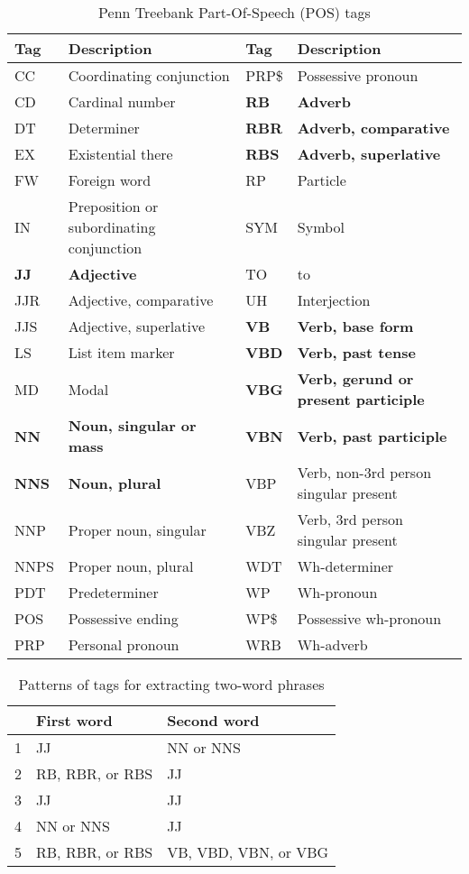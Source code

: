 \begin{table}\centering
	\caption{Penn Treebank Part-Of-Speech (POS) tags}\label{tab:posTags}
   	\begin{tabular}{|l|p{5cm\textwidth}|l|p{5cm\textwidth}|}
   	\hline
   	\textbf{Tag}  & \textbf{Description} & \textbf{Tag}  & \textbf{Description}\\ \hline
	CC &Coordinating conjunction &PRP\$ &Possessive pronoun \\ \hline
	CD &Cardinal number &\textbf{RB} &\textbf{Adverb} \\ \hline
	DT &Determiner &\textbf{RBR} &\textbf{Adverb, comparative} \\ \hline
	EX &Existential there &\textbf{RBS} &\textbf{Adverb, superlative} \\ \hline
	FW &Foreign word &RP &Particle \\ \hline
	IN &Preposition or subordinating conjunction &SYM &Symbol \\ \hline
	\textbf{JJ} &\textbf{Adjective} &TO &to \\ \hline
	JJR &Adjective, comparative &UH &Interjection \\ \hline
	JJS &Adjective, superlative &\textbf{VB} &\textbf{Verb, base form} \\ \hline
	LS &List item marker &\textbf{VBD} &\textbf{Verb, past tense} \\ \hline
	MD &Modal &\textbf{VBG} &\textbf{Verb, gerund or present participle} \\ \hline
	\textbf{NN} &\textbf{Noun, singular or mass} &\textbf{VBN} &\textbf{Verb, past participle} \\ \hline
	\textbf{NNS} &\textbf{Noun, plural} &VBP &Verb, non-3rd person singular present \\ \hline
	NNP &Proper noun, singular &VBZ &Verb, 3rd person singular present \\ \hline
	NNPS &Proper noun, plural &WDT &Wh-determiner \\ \hline
	PDT &Predeterminer &WP &Wh-pronoun \\ \hline
	POS &Possessive ending &WP\$ &Possessive wh-pronoun \\ \hline
	PRP &Personal pronoun &WRB &Wh-adverb \\ \hline
    \end{tabular}
\end{table}

\pagebreak
\begin{table}\centering
	\caption{Patterns of tags for extracting two-word phrases}\label{tab:twoWordPhrases}
   \begin{tabular}{|l|l|l|}
   	\hline
   	\textbf{ }  & \textbf{First word}  & \textbf{Second word} \\ \hline
	1&JJ &NN or NNS \\ \hline
	2&RB, RBR, or RBS &JJ \\ \hline
	3&JJ &JJ \\ \hline
	4&NN or NNS &JJ \\ \hline
	5&RB, RBR, or RBS &VB, VBD, VBN, or VBG \\ \hline
    \end{tabular}
\end{table}


